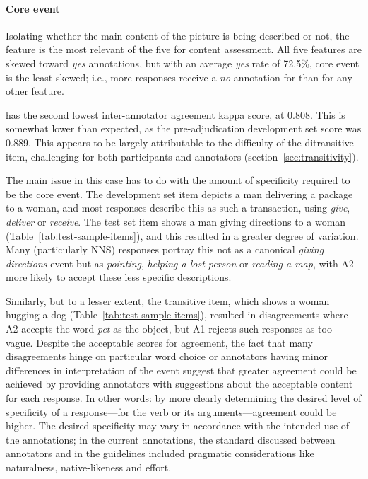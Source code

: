 \paragraph{Core event} Isolating whether the main content of the picture is being described or not, the  feature is the most relevant of the five for content assessment. All five features are skewed toward \textit{yes} annotations, but with an average \textit{yes} rate of 72.5\%, core event is the least skewed; i.e., more responses receive a \textit{no} annotation for  than for any other feature.

 has the second lowest inter-annotator agreement kappa score, at 0.808. This is somewhat lower than expected, as the pre-adjudication development set score was 0.889. This appears to be largely attributable to the difficulty of the ditransitive item, challenging for both participants and annotators (section~\ref{sec:transitivity}). 

The main issue in this case has to do with the amount of specificity required to be the core event.  The development set item depicts a man delivering a package to a woman, and most responses describe this as such a transaction, using \textit{give}, \textit{deliver} or \textit{receive}. The test set item shows a man giving directions to a woman (Table~\ref{tab:test-sample-items}), and this resulted in a greater degree of variation. Many  (particularly NNS) responses portray this not as a canonical \textit{giving directions} event but as \textit{pointing}, 
\textit{helping a lost person} or \textit{reading a map}, with A2 more likely to accept these less specific descriptions.

Similarly, but to a lesser extent, the transitive item, which shows a woman hugging a dog (Table~\ref{tab:test-sample-items}), resulted in disagreements where A2 accepts the word \textit{pet} as the object, but A1 rejects such responses as too vague. Despite the acceptable scores for  agreement, the fact that many disagreements hinge on particular word choice or annotators having minor differences in interpretation of the event suggest that greater agreement could be achieved by providing annotators with suggestions about the acceptable content for each response. In other words: by more clearly determining the desired level of specificity of a response---for the verb or its arguments---agreement could be higher. The desired specificity may vary in accordance with the intended use of the annotations; in the current annotations, the standard discussed between annotators and in the guidelines included pragmatic considerations like naturalness, native-likeness and effort.

